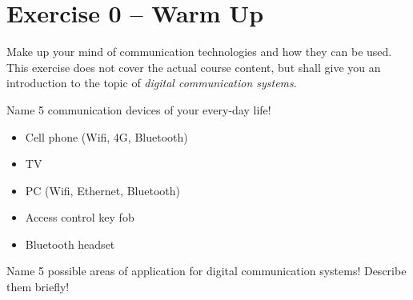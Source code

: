 %
%
%

{}
\section*{Exercise 0 -- Warm Up}

Make up your mind of communication technologies and how they can be used. This exercise does not cover the actual course content, but shall give you an introduction to the topic of \emph{digital communication systems}.

\begin{question}
	Name 5 communication devices of your every-day life!
\end{question}

\begin{solution}
	\begin{itemize}
		\item Cell phone (Wifi, 4G, Bluetooth)
		\item TV
		\item PC (Wifi, Ethernet, Bluetooth)
		\item Access control key fob
		\item Bluetooth headset
	\end{itemize}
\end{solution}

\begin{question}
	Name 5 possible areas of application for digital communication systems! Describe them briefly!
\end{question}
